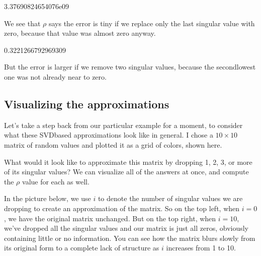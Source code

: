\documentclass[letterpaper,10pt,english]{jupyterBook}
\begin{document}
\begin{sphinxVerbatim}[commandchars=\\\{\}]
3.37690824654076e\PYGZhy{}09
\end{sphinxVerbatim}

\sphinxAtStartPar
We see that \(\rho\) says the error is tiny if we replace only the last singular value with zero, because that value was almost zero anyway.

\begin{sphinxVerbatim}[commandchars=\\\{\}]
   
\end{sphinxVerbatim}

\begin{sphinxVerbatim}[commandchars=\\\{\}]
0.3221266792969309
\end{sphinxVerbatim}

\sphinxAtStartPar
But the error is larger if we remove two singular values, because the second\sphinxhyphen{}lowest one was not already near to zero.


\subsection{Visualizing the approximations}
\label{\detokenize{chapter-16-matrices:visualizing-the-approximations}}
\sphinxAtStartPar
Let’s take a step back from our particular example for a moment, to consider what these SVD\sphinxhyphen{}based approximations look like in general.  I chose a \(10\times10\) matrix of random values and plotted it as a grid of colors, shown here.

\sphinxAtStartPar
{}

\sphinxAtStartPar
What would it look like to approximate this matrix by dropping 1, 2, 3, or more of its singular values?  We can visualize all of the answers at once, and compute the \(\rho\) value for each as well.

\sphinxAtStartPar
In the picture below, we use \(i\) to denote the number of singular values we are dropping to create an approximation of the matrix.  So on the top left, when \(i=0\), we have the original matrix unchanged.  But on the top right, when \(i=10\), we’ve dropped all the singular values and our matrix is just all zeros, obviously containing little or no information.  You can see how the matrix blurs slowly from its original form to a complete lack of structure as \(i\) increases from 1 to 10.
\end{document}
